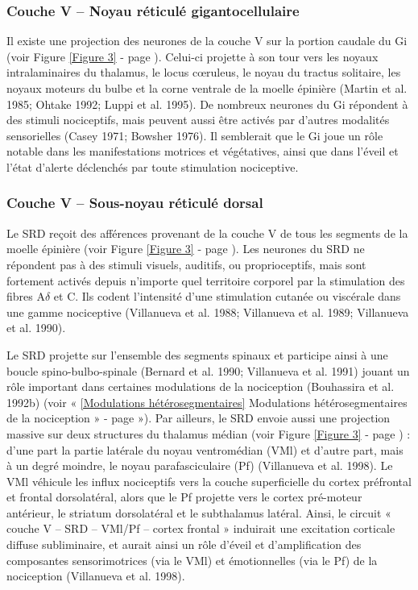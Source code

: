 \documentclass[a4paper,12pt,twoside]{report}
\begin{document}
\subsubsection{Couche V – Noyau réticulé gigantocellulaire}

Il existe une projection des neurones de la couche V sur la portion caudale du Gi (voir Figure \ref{Figure 3} - page \pageref{Figure 3}). Celui-ci projette à son tour vers les noyaux intralaminaires du thalamus, le locus cœruleus, le noyau du tractus solitaire, les noyaux moteurs du bulbe et la corne ventrale de la moelle épinière (Martin et al. 1985; Ohtake 1992; Luppi et al. 1995). De nombreux neurones du Gi répondent à des stimuli nociceptifs, mais peuvent aussi être activés par d'autres modalités sensorielles (Casey 1971; Bowsher 1976). Il semblerait que le Gi joue un rôle notable dans les manifestations motrices et végétatives, ainsi que dans l'éveil et l'état d'alerte déclenchés par toute stimulation nociceptive.

\subsubsection{Couche V – Sous-noyau réticulé dorsal}

Le SRD reçoit des afférences provenant de la couche V de tous les segments de la moelle épinière (voir Figure \ref{Figure 3} - page \pageref{Figure 3}). Les neurones du SRD ne répondent pas à des stimuli visuels, auditifs, ou proprioceptifs, mais sont fortement activés depuis n’importe quel territoire corporel par la stimulation des fibres A$\delta$ et C. Ils codent l’intensité d’une stimulation cutanée ou viscérale dans une gamme nociceptive (Villanueva et al. 1988; Villanueva et al. 1989; Villanueva et al. 1990).

Le SRD projette sur l’ensemble des segments spinaux et participe ainsi à une boucle spino-bulbo-spinale (Bernard et al. 1990; Villanueva et al. 1991) jouant un rôle important dans certaines modulations de la nociception (Bouhassira et al. 1992b) (voir « \ref{Modulations hétérosegmentaires} Modulations hétérosegmentaires de la nociception » - page \pageref{Modulations hétérosegmentaires} »). Par ailleurs, le SRD envoie aussi une projection massive sur deux structures du thalamus médian (voir Figure \ref{Figure 3} - page \pageref{Figure 3}) : d’une part la partie latérale du noyau ventromédian (VMl) et d’autre part, mais à un degré moindre, le noyau parafasciculaire (Pf) (Villanueva et al. 1998). Le VMl véhicule les influx nociceptifs vers la couche superficielle du cortex préfrontal et frontal dorsolatéral, alors que le Pf projette vers le cortex pré-moteur antérieur, le striatum dorsolatéral et le subthalamus latéral. Ainsi, le circuit « couche V – SRD – VMl/Pf – cortex frontal » induirait une excitation corticale diffuse subliminaire, et aurait ainsi un rôle d'éveil et d'amplification des composantes sensorimotrices (via le VMl) et émotionnelles (via le Pf) de la nociception (Villanueva et al. 1998).
\end{document}
